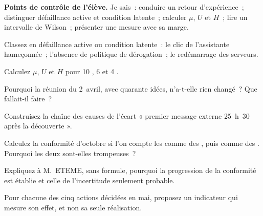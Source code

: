 \begin{boxinfo}
\textbf{Points de contrôle de l'élève.} Je sais~: conduire un retour
d'expérience~; distinguer défaillance active et condition latente~;
calculer $\mu$, $U$ et $H$~; lire un intervalle de Wilson~; présenter une
mesure avec sa marge.
\end{boxinfo}

\bigskip

\begin{boxexo}[title={\ding{45}\quad Exercice~26.1. Actif ou latent \niveaubase}]
Classez en défaillance active ou condition latente~: le clic de
l'assistante hameçonnée~; l'absence de politique de dérogation~; le
redémarrage des serveurs.
\end{boxexo}

\begin{boxexo}[title={\ding{45}\quad Exercice~26.2. Calculer \niveaubase}]
Calculez $\mu$, $U$ et $H$ pour 10 \OUI{}, 6 \NON{} et 4 \NEK{}.
\end{boxexo}

\begin{boxexo}[title={\ding{45}\quad Exercice~26.3. Quarante idées \niveaubase}]
Pourquoi la réunion du 2~avril, avec quarante idées, n'a-t-elle rien
changé~? Que fallait-il faire~?
\end{boxexo}

\begin{boxexo}[title={\ding{45}\quad Exercice~26.4. La chaîne \niveaumoyen}]
Construisez la chaîne des causes de l'écart « premier message externe
25~h~30 après la découverte ».
\end{boxexo}

\begin{boxexo}[title={\ding{45}\quad Exercice~26.5. NEK compté \niveaumoyen}]
Calculez la conformité d'octobre si l'on compte les \NEK{} comme des
\OUI{}, puis comme des \NON{}. Pourquoi les deux sont-elles trompeuses~?
\end{boxexo}

\begin{boxexo}[title={\ding{45}\quad Exercice~26.6. Les intervalles \niveaumoyen}]
Expliquez à M.~ETEME, sans formule, pourquoi la progression de la
conformité est établie et celle de l'incertitude seulement probable.
\end{boxexo}

\begin{boxexo}[title={\ding{45}\quad Exercice~26.7. Un indicateur d'effet \niveaumoyen}]
Pour chacune des cinq actions décidées en mai, proposez un indicateur qui
mesure son effet, et non sa seule réalisation.
\end{boxexo}

